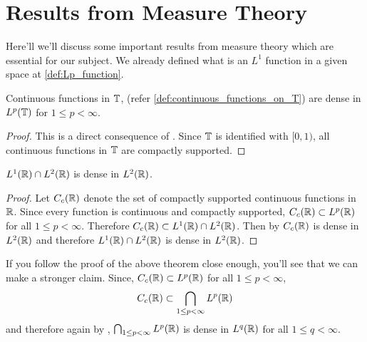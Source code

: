 
\chapter{Results from Measure Theory}
Here'll we'll discuss some important results from measure theory which are essential for our subject. We already defined what is an $L^1$ function in a given space at \autoref{def:Lp_function}.

\begin{theorem}
  \label{thm:continuous_functions_in_T_are_dense_in_L1}
  Continuous functions in $\mathbb T$, (refer \autoref{def:continuous_functions_on_T}) are dense in $L^p(\mathbb T)$ for $1\le p < \infty$.
\end{theorem}
\begin{proof}
  This is a direct consequence of \autocite[Theorem~3.14 on \pno~69]{papaRudin}. Since $\mathbb T$ is identified with $[0, 1)$, all continuous functions in $\mathbb T$ are compactly supported.
\end{proof}

\begin{theorem}
  \label{thm:L1_functions_are_dense_in_L2}
  $L^1(\mathbb R) \cap L^2(\mathbb R)$ is dense in $L^2(\mathbb R)$.
\end{theorem}
\begin{proof}
  Let $C_c(\mathbb R)$ denote the set of compactly supported continuous functions in $\mathbb R$. Since every function is continuous and compactly supported, $C_c(\mathbb R) \subset L^p(\mathbb R)$ for all $1\le p < \infty$. Therefore $C_c(\mathbb R) \subset L^1(\mathbb R) \cap L^2(\mathbb R)$. Then by \autocite[Theorem~3.14 on \pno~69]{papaRudin} $C_c(\mathbb R)$ is dense in $L^2(\mathbb R)$ and therefore $L^1(\mathbb R) \cap L^2(\mathbb R)$ is dense in $L^2(\mathbb R)$.
\end{proof}

If you follow the proof of the above theorem close enough, you'll see that we can make a stronger claim. Since, $C_c(\mathbb R) \subset L^p(\mathbb R)$ for all $1\le p < \infty$, $$C_c(\mathbb R) \subset \bigcap_{1\le p < \infty} L^p(\mathbb R)$$
and therefore again by \autocite[Theorem~3.14 on \pno~69]{papaRudin}, $\bigcap_{1\le p < \infty} L^p(\mathbb R)$ is dense in $L^q(\mathbb R)$ for all $1 \le q < \infty$.

